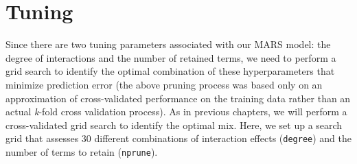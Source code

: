 \documentclass[]{book}
\newenvironment{Shaded}{\begin{snugshade}}{\end{snugshade}}
\newcommand{\CommentTok}[1]{\textcolor[rgb]{0.56,0.35,0.01}{\textit{#1}}}
\newcommand{\DataTypeTok}[1]{\textcolor[rgb]{0.13,0.29,0.53}{#1}}
\newcommand{\DecValTok}[1]{\textcolor[rgb]{0.00,0.00,0.81}{#1}}
\newcommand{\KeywordTok}[1]{\textcolor[rgb]{0.13,0.29,0.53}{\textbf{#1}}}
\newcommand{\NormalTok}[1]{#1}
\newcommand{\OperatorTok}[1]{\textcolor[rgb]{0.81,0.36,0.00}{\textbf{#1}}}
\newcommand{\StringTok}[1]{\textcolor[rgb]{0.31,0.60,0.02}{#1}}
\theoremstyle{definition}
\theoremstyle{definition}
\theoremstyle{definition}
\theoremstyle{remark}
\begin{document}
\begin{Shaded}
\end{Shaded}

\hypertarget{tuning}{%
\section{Tuning}\label{tuning}}

Since there are two tuning parameters associated with our MARS model:
the degree of interactions and the number of retained terms, we need to
perform a grid search to identify the optimal combination of these
hyperparameters that minimize prediction error (the above pruning
process was based only on an approximation of cross-validated
performance on the training data rather than an actual \emph{k}-fold
cross validation process). As in previous chapters, we will perform a
cross-validated grid search to identify the optimal mix. Here, we set up
a search grid that assesses 30 different combinations of interaction
effects (\texttt{degree}) and the number of terms to retain
(\texttt{nprune}).
\end{document}
